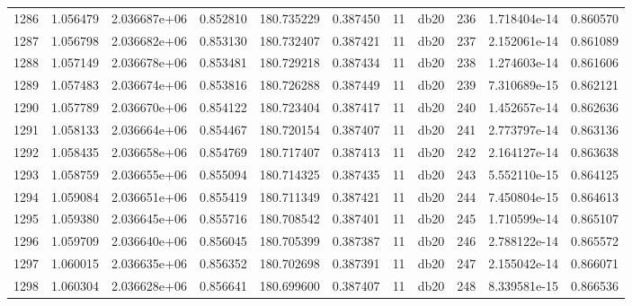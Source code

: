 \begin{tabular}{lrrrrrrlrrr}
1286 &    1.056479 &        2.036687e+06 &  0.852810 &              180.735229 &    0.387450 &      11 &         db20 &    236 &   1.718404e-14 &      0.860570 \\
1287 &    1.056798 &        2.036682e+06 &  0.853130 &              180.732407 &    0.387421 &      11 &         db20 &    237 &   2.152061e-14 &      0.861089 \\
1288 &    1.057149 &        2.036678e+06 &  0.853481 &              180.729218 &    0.387434 &      11 &         db20 &    238 &   1.274603e-14 &      0.861606 \\
1289 &    1.057483 &        2.036674e+06 &  0.853816 &              180.726288 &    0.387449 &      11 &         db20 &    239 &   7.310689e-15 &      0.862121 \\
1290 &    1.057789 &        2.036670e+06 &  0.854122 &              180.723404 &    0.387417 &      11 &         db20 &    240 &   1.452657e-14 &      0.862636 \\
1291 &    1.058133 &        2.036664e+06 &  0.854467 &              180.720154 &    0.387407 &      11 &         db20 &    241 &   2.773797e-14 &      0.863136 \\
1292 &    1.058435 &        2.036658e+06 &  0.854769 &              180.717407 &    0.387413 &      11 &         db20 &    242 &   2.164127e-14 &      0.863638 \\
1293 &    1.058759 &        2.036655e+06 &  0.855094 &              180.714325 &    0.387435 &      11 &         db20 &    243 &   5.552110e-15 &      0.864125 \\
1294 &    1.059084 &        2.036651e+06 &  0.855419 &              180.711349 &    0.387421 &      11 &         db20 &    244 &   7.450804e-15 &      0.864613 \\
1295 &    1.059380 &        2.036645e+06 &  0.855716 &              180.708542 &    0.387401 &      11 &         db20 &    245 &   1.710599e-14 &      0.865107 \\
1296 &    1.059709 &        2.036640e+06 &  0.856045 &              180.705399 &    0.387387 &      11 &         db20 &    246 &   2.788122e-14 &      0.865572 \\
1297 &    1.060015 &        2.036635e+06 &  0.856352 &              180.702698 &    0.387391 &      11 &         db20 &    247 &   2.155042e-14 &      0.866071 \\
1298 &    1.060304 &        2.036628e+06 &  0.856641 &              180.699600 &    0.387407 &      11 &         db20 &    248 &   8.339581e-15 &      0.866536 \\

\end{tabular}
